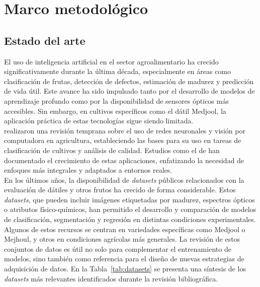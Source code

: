 
\chapter{Marco metodológico}

\label{Chapter3}


\section{Estado del arte}

El uso de inteligencia artificial en el sector agroalimentario ha crecido significativamente durante la última década, especialmente en áreas como clasificación de frutas, detección de defectos, estimación de madurez y predicción de vida útil. Este avance ha sido impulsado tanto por el desarrollo de modelos de aprendizaje profundo como por la disponibilidad de sensores ópticos más accesibles. Sin embargo, en cultivos específicos como el dátil Medjool, la aplicación práctica de estas tecnologías sigue siendo limitada.\\

\parencite{kamilaris_deep_2018} realizaron una revisión temprana sobre el uso de redes neuronales y visión por computadora en agricultura, estableciendo las bases para su uso en tareas de clasificación de cultivos y análisis de calidad. Estudios como el de \parencite{garcia_vazquez_scientometric_2021, upadhyay_artificial_2025} han documentado el crecimiento de estas aplicaciones, enfatizando la necesidad de enfoques más integrales y adaptados a entornos reales.\\

En los últimos años, la disponibilidad de \textit{datasets} públicos relacionados con la evaluación de dátiles y otros frutos ha crecido de forma considerable. Estos \textit{datasets}, que pueden incluir imágenes etiquetadas por madurez, espectros ópticos o atributos físico-químicos, han permitido el desarrollo y comparación de modelos de clasificación, segmentación y regresión en distintas condiciones experimentales. Algunos de estos recursos se centran en variedades específicas como Medjool o Mejhoul, y otros en condiciones agrícolas más generales. La revisión de estos conjuntos de datos es útil no solo para complementar el entrenamiento de modelos, sino también como referencia para el diseño de nuevas estrategias de adquisición de datos. En la Tabla~\ref{tab:datasets} se presenta una síntesis de los \textit{datasets} más relevantes identificados durante la revisión bibliográfica.\\


